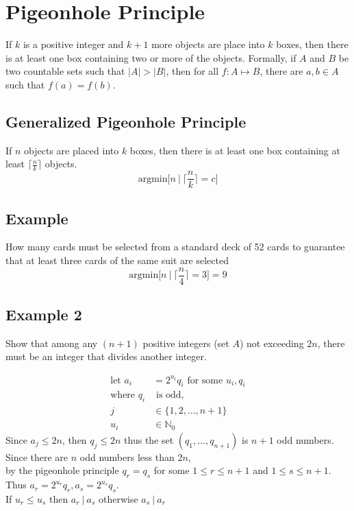 \documentclass{article}
\theoremstyle{mytheoremstyle}
\theoremstyle{mytheoremstyle}
\theoremstyle{myproblemstyle}
\begin{document}
    \section*{Pigeonhole Principle}
    If $k$ is a positive integer and $k+1$ more objects are place into $k$
    boxes, then there is at least one box containing two or more of the objects.
    Formally, if $A$ and $B$ be two countable sets such that  $|A| > |B|$, then
    for all $f: A \mapsto B$, there are $a,b\in A$ such that $f(a)=f(b)$.


    \subsection*{Generalized Pigeonhole Principle}
    If $n$ objects are placed into $k$ boxes, then there is at least one box
    containing at least $\lceil \frac{n}{k} \rceil$ objects.
    \[
        \text{argmin}\Big[n\ |\ \Big\lceil \frac{n}{k} \Big\rceil = c\Big]
    \]

    \subsection*{Example}
    How many cards must be selected from a standard deck of 52 cards to
    guarantee that at least three cards of the same suit are selected
    \[
        \text{argmin}\Big[n\ |\ \Big\lceil \frac{n}{4} \Big\rceil = 3\Big] = 9
    \]

    \subsection*{Example 2}
    Show that among any $(n+1)$ positive integers (set $A$) not exceeding $2n$,
    there must be an integer that divides another integer.

    \begin{align*}
        \text{let } a_i &= 2^{u_i} q_i \text{ for some } u_i,q_i \\
        \text{where } q_i &\text{ is odd}, \\
        j&\in\{1,2,\dots,n+1\} \\
        u_i&\in \mathbb{N}_0
    \end{align*}
    Since $a_j \le 2n$, then $q_j\le 2n$ thus the set $(q_1,\dots,q_{n+1})$ is
    $n+1$ odd numbers. \\
    Since there are $n$ odd numbers less than $2n$, \\
    by the pigeonhole principle $q_r=q_s$ for some $1\le r\le n+1$ and $1\le s\le n+1$. \\
    Thus $a_r=2^{u_r}q_r, a_s=2^{u_s}q_s$. \\
    If $u_r\le u_s$ then $a_r\ |\ a_s$ otherwise $a_s\ |\ a_r$
\end{document}
